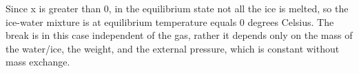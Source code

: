 Since x is greater than 0, in the equilibrium state not all the ice is melted, so the ice-water mixture is at equilibrium temperature equals 0 degrees Celsius. The break is in this case independent of the gas, rather it depends only on the mass of the water/ice, the weight, and the external pressure, which is constant without mass exchange.